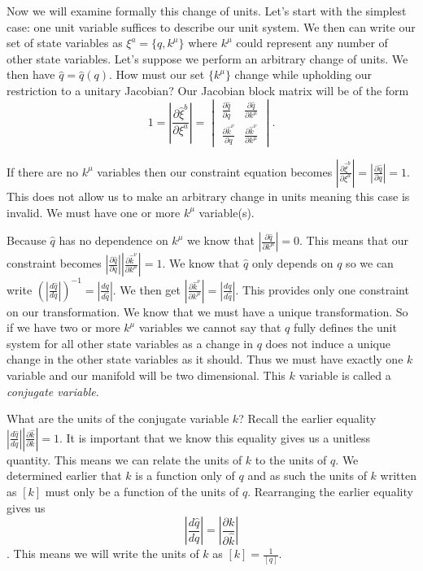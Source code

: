 \documentclass{article}
\begin{document}
	Now we will examine formally this change of units. Let's start with the simplest case: one unit variable suffices to describe our unit system. We then can write our set of state variables as $\xi^a = \{q,k^\mu\}$ where $k^\mu$ could represent any number of other state variables. Let's suppose we perform an arbitrary change of units. We then have $\hat{q} = \hat{q}(q)$. How must our set $\{k^\mu\}$ change while upholding our restriction to a unitary Jacobian? Our Jacobian block matrix will be of the form $$1 = \left|\frac{\partial\hat{\xi}^b}{\partial\xi^a}\right| = \begin{vmatrix}
\frac{\partial \hat{q}}{\partial q} & \frac{\partial \hat{q}}{\partial k^\mu} \\
\frac{\partial \hat{k}^\nu}{\partial q} & \frac{\partial \hat{k}^\nu}{\partial k^\mu}
\end{vmatrix}.$$

	If there are no $k^\mu$ variables then our constraint equation becomes $\left|\frac{\partial\hat{\xi}^b}{\partial\xi^a}\right| = \left|\frac{\partial \hat{q}}{\partial q}\right| = 1$. This does not allow us to make an arbitrary change in units meaning this case is invalid. We must have one or more $k^\mu$ variable(s).

	Because $\hat{q}$ has no dependence on $k^\mu$ we know that $\left|\frac{\partial \hat{q}}{\partial k^\mu}\right| = 0$. This means that our constraint becomes $\left|\frac{\partial \hat{q}}{\partial q}\right|\left|\frac{\partial \hat{k}^\nu}{\partial k^\mu}\right| = 1$. We know that $\hat{q}$ only depends on $q$ so we can write $(\left|\frac{d \hat{q}}{d q}\right|)^{-1} = \left|\frac{d q}{d \hat{q}}\right|$. We then get $\left|\frac{\partial \hat{k}^\nu}{\partial k^\mu}\right| = \left|\frac{d q}{d \hat{q}}\right|$. This provides only one constraint on our transformation. We know that we must have a unique transformation. So if we have two or more $k^\mu$ variables we cannot say that $q$ fully defines the unit system for all other state variables as a change in $q$ does not induce a unique change in the other state variables as it should. Thus we must have exactly one $k$ variable and our manifold will be two dimensional. This $k$ variable is called a \textit{conjugate variable}.
	
	What are the units of the conjugate variable $k$? Recall the earlier equality $\left|\frac{d\hat{q}}{dq}\right|\left|\frac{\partial \hat{k}}{\partial k}\right| = 1$. It is important that we know this equality gives us a unitless quantity. This means we can relate the units of $k$ to the units of $q$. We determined earlier that $k$ is a function only of $q$ and as such the units of $k$ written as $[k]$ must only be a function of the units of $q$. Rearranging the earlier equality gives us $$\left|\frac{d\hat{q}}{dq}\right| = \left|\frac{\partial k}{\partial \hat{k}}\right|$$. This means we will write the units of $k$ as $[k] = \frac{1}{[q]}$.
	
\end{document}
